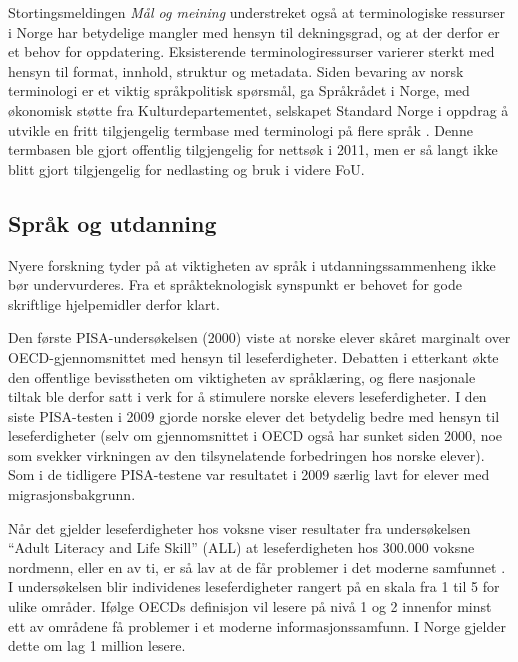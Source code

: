 \begin{multicols}{2}
Stortingsmeldingen \textit{Mål og meining} understreket også at terminologiske ressurser i Norge har betydelige mangler med hensyn til dekningsgrad, og at der derfor er et behov for oppdatering.  Eksisterende terminologiressurser varierer sterkt med hensyn til format, innhold, struktur og metadata. 
Siden bevaring av norsk terminologi er et viktig språkpolitisk spørsmål, ga Språkrådet i Norge, med økonomisk støtte fra Kulturdepartementet, selskapet Standard Norge i oppdrag å utvikle en fritt tilgjengelig termbase med terminologi på flere språk \cite{drosdal2010}. 
Denne termbasen ble gjort offentlig tilgjengelig for nettsøk i 2011, men er så langt ikke blitt gjort tilgjengelig for nedlasting og bruk i videre FoU.
 
\subsection{Språk og utdanning}

Nyere forskning tyder på at viktigheten av språk i utdanningssammenheng ikke bør undervurderes. 
Fra et språkteknologisk synspunkt er behovet for gode skriftlige hjelpemidler derfor klart.

Den første PISA-undersøkelsen (2000) viste at norske elever skåret marginalt over OECD-gjennomsnittet med hensyn til leseferdigheter. 
Debatten i etterkant økte den offentlige bevisstheten om viktigheten av språklæring, og flere nasjonale tiltak ble derfor satt i verk for å stimulere norske elevers  leseferdigheter. 
I den siste PISA-testen i 2009 \cite{pisa2009eng} gjorde norske elever det betydelig bedre med hensyn til leseferdigheter (selv om gjennomsnittet i OECD også har sunket siden 2000, noe som svekker virkningen av den tilsynelatende forbedringen hos norske elever). 
Som i de tidligere PISA-testene var resultatet i 2009 særlig lavt for elever med migrasjonsbakgrunn.


Når det gjelder leseferdigheter hos voksne viser resultater fra undersøkelsen ``Adult Literacy and Life Skill'' (ALL) at leseferdigheten hos 300.000 voksne nordmenn, eller en av ti, er så lav at de får problemer i det moderne samfunnet \cite{gab:2005}. 
I undersøkelsen blir individenes leseferdigheter rangert på en skala fra 1 til 5 for ulike områder. Ifølge OECDs definisjon vil lesere på nivå 1 og 2 innenfor minst ett av områdene få problemer i et moderne informasjonssamfunn. I Norge gjelder dette om lag 1 million lesere.


\end{multicols}
